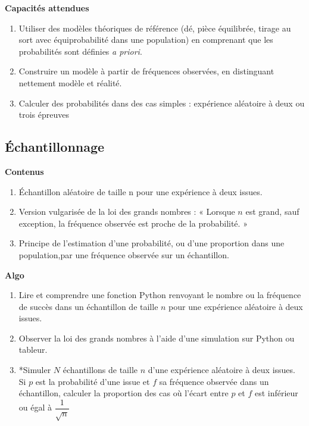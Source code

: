 \documentclass[10pt,a4paper]{article}
\begin{document}
\textbf{Capacités attendues}
 
\begin{enumerate}
\item Utiliser des modèles théoriques de référence (dé, pièce équilibrée, tirage au sort avec équiprobabilité dans une population) en comprenant que les probabilités sont définies \textit{a priori}.
\item Construire un modèle à partir de fréquences observées, en distinguant nettement modèle et réalité.
\item  Calculer des probabilités dans des cas simples : expérience aléatoire à deux ou trois épreuves

\end{enumerate}
 
 

  
\subsection*{Échantillonnage}

\textbf{Contenus} 
 
\begin{enumerate} 
\item Échantillon aléatoire de taille n pour une expérience à deux issues.
\item Version vulgarisée de la loi des grands nombres : « Lorsque $n$ est grand, sauf exception, la fréquence observée est proche de la probabilité. »
\item Principe de l'estimation d'une probabilité, ou d'une proportion dans une population,par une fréquence observée sur un échantillon.
\end{enumerate}

\textbf{Algo}

 
\begin{enumerate} 
\item Lire et comprendre une fonction Python renvoyant le nombre ou la fréquence de succès dans un échantillon de taille $n$ pour une expérience aléatoire à deux issues.
\item Observer la loi des grands nombres à l'aide d'une simulation sur Python ou tableur.
\item *Simuler $N$ échantillons de taille $n$ d'une expérience aléatoire à deux issues. Si $p$ est la probabilité d’une issue et $f$ sa fréquence observée dans un échantillon, calculer la proportion des cas où l'écart entre $p$ et $f$ est inférieur ou égal à $\dfrac{1}{\sqrt n}$
\end{enumerate}
\end{document}
